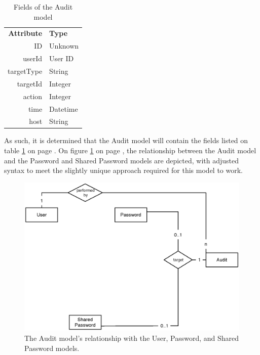 			\begin{table}[p]
				\centering
				\begin{tabular}{r|l}
					\textbf{Attribute} 		& \textbf{Type} 		\\
					ID 						& Unknown 	\\
					userId 					& User ID 	\\
					targetType 				& String 	\\
					targetId				& Integer 	\\
					action					& Integer 	\\
					time  					& Datetime 	\\
					host  					& String 	\\
				\end{tabular}
				\caption{Fields of the Audit model}
				\label{fig:model:audit}
			\end{table}

			As such, it is determined that the Audit model will contain the fields listed on table \ref{fig:model:audit} on page \pageref{fig:model:audit}. On figure \ref{fig:relationship:audit-user} on page \pageref{fig:relationship:audit-user}, the relationship between the Audit model and the Password and Shared Password models are depicted, with adjusted syntax to meet the slightly unique approach required for this model to work.
			
			\begin{figure}[p]
				\centering
				\includegraphics[width=\textwidth]{figures/design/uml/audit-user-password-shared-password-erd.eps}
				\caption{The Audit model's relationship with the User, Password, and Shared Password models.}
				\label{fig:relationship:audit-user}
			\end{figure}


